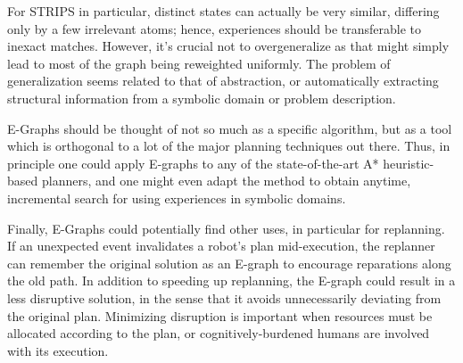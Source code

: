 \documentclass[letterpaper]{article}
\begin{document}
For STRIPS in particular, distinct states can actually be very similar, differing only by a few irrelevant atoms; hence, experiences should be transferable to inexact matches. However, it's crucial not to overgeneralize as that might simply lead to most of the graph being reweighted uniformly. The problem of generalization seems related to that of abstraction, or automatically extracting structural information from a symbolic domain or problem description.

E-Graphs should be thought of not so much as a specific algorithm, but as a tool which is orthogonal to a lot of the major planning techniques out there. Thus, in principle one could apply E-graphs to any of the state-of-the-art A* heuristic-based planners, and one might even adapt the method to obtain anytime, incremental search for using experiences in symbolic domains.

Finally, E-Graphs could potentially find other uses, in particular for replanning. If an unexpected event invalidates a robot's plan mid-execution, the replanner can remember the original solution as an E-graph to encourage reparations along the old path. In addition to speeding up replanning, the E-graph could result in a less disruptive solution, in the sense that it avoids unnecessarily deviating from the original plan. Minimizing disruption is important when resources must be allocated according to the plan, or cognitively-burdened humans are involved with its execution.



\end{document}
